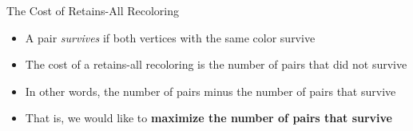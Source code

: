 \begin{frame}{The Cost of Retains-All Recoloring}
\begin{itemize}

\item
A pair \emph{survives} if both vertices with the same color survive

\pause\item 
The cost of a retains-all recoloring is the number of pairs that did not survive

\pause\item 	 
In other words, the number of pairs minus the number of pairs that survive

\pause\item 
That is, we would like to \textbf{maximize the number of pairs that survive}


\end{itemize}
\end{frame}